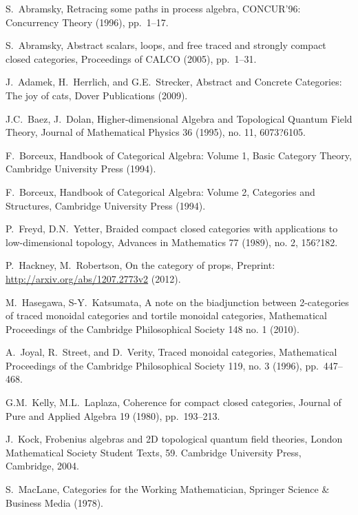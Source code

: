 \documentclass[12pt,oneside,article,draft]{memoir}
\begin{document}
\begin{thebibliography}{XXX}
 S.~Abramsky, Retracing some paths in process algebra, CONCUR'96: Concurrency Theory (1996), pp.~1--17.

 S.~Abramsky, Abstract scalars, loops, and free traced and strongly compact closed categories, Proceedings of CALCO (2005), pp.~1--31.

 J.~Adamek, H.~Herrlich, and G.E.~Strecker, Abstract and Concrete Categories: The joy of cats, Dover Publications (2009).
 
 J.C.~Baez, J.~Dolan, Higher-dimensional Algebra and Topological Quantum Field Theory, Journal of Mathematical Physics 36 (1995), no. 11, 6073?6105.
 
F.~Borceux, Handbook of Categorical Algebra: Volume 1, Basic Category Theory, Cambridge University Press (1994).

 F.~Borceux, Handbook of Categorical Algebra: Volume 2, Categories and Structures, Cambridge University Press (1994).
 
 P.~Freyd, D.N.~Yetter, Braided compact closed categories with applications to low-dimensional topology,
Advances in Mathematics 77 (1989), no. 2, 156?182. 

 P.~Hackney, M.~Robertson, On the category of props, Preprint: \url{http://arxiv.org/abs/1207.2773v2} (2012).
 
M.~Hasegawa, S-Y.~Katsumata, A note on the biadjunction between 2-categories of traced monoidal categories and tortile monoidal categories, Mathematical Proceedings of the Cambridge Philosophical Society 148 no. 1 (2010).

 A.~Joyal, R.~Street, and D.~Verity, Traced monoidal categories, Mathematical Proceedings of the Cambridge Philosophical Society 119, no. 3 (1996), pp.~447--468.
 
 G.M.~Kelly, M.L.~Laplaza, Coherence for compact closed categories, Journal of Pure and Applied Algebra 19 (1980), pp.~193--213.
 
 J.~Kock, Frobenius algebras and 2D topological quantum field theories, London Mathematical Society Student Texts, 59. Cambridge University Press, Cambridge, 2004. 

 S.~MacLane, Categories for the Working Mathematician, Springer Science \& Business Media (1978).


\end{thebibliography}
\end{document}
